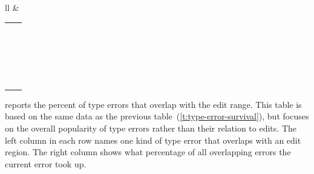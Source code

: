 \documentclass[english,submission,cleveref]{programming}
\begin{document}
\begin{table}[t]
\begin{tabular}{ll}
        &
    \begin{tabular}[t]{l@{~}r}
      \code{UnknownSymbol} & \pct{23.97} \\
      \code{TypeMismatch} & \pct{20.46} \\
      \code{UnknownProperty} & \pct{18.88} \\
      \code{SyntaxError} & \pct{9.31} \\
      \code{CannotInferBinaryOperation} & \pct{6.94} \\
      \code{MissingProperties} & \pct{4.04} \\
      \code{CountMismatch} & \pct{2.99} \\
      \code{OptionalValueAccess} & \pct{2.99} \\
      \code{FunctionExitsWithoutReturning} & \pct{2.99} \\
      \code{UnknownRequire} & \pct{2.37} \\
      \code{GenericError} & \pct{2.28} \\
      \code{NotATable} & \pct{1.32} \\
      \code{ExtraInformation} & \pct{0.35} \\
      \code{UnknownPropButFoundLikeProp} & \pct{0.26} \\
      \code{IncorrectGenericParameterCount} & \pct{0.18} \\
      \code{CannotCallNonFunction} & \pct{0.18} \\
      \code{IllegalRequire} & \pct{0.18} \\
      \code{ModuleHasCyclicDependency} & \pct{0.09} \\
      \code{CannotExtendTable} & \pct{0.09} \\
      \code{OccursCheckFailed} & \pct{0.09} \\
      \code{TypesAreUnrelated} & \pct{0.09} \\
    \end{tabular}
  \end{tabular}
\end{table}

 reports the percent of
type errors that overlap with the edit range.
This table is based on the same data as the previous table~(\cref{t:type-error-survival}),
but focuses on the overall popularity of type errors
rather than their relation to edits.
The left column in each row names one kind of type error
that overlaps with an edit region.
The right column shows what percentage of all overlapping
errors the current error took up.
\end{document}
